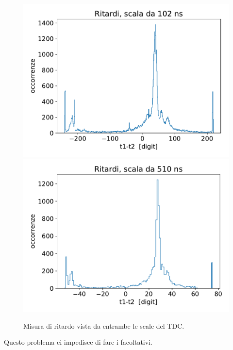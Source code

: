 \begin{figure}[h]
\centering
\subfloat
{\includegraphics[width=17 em]{immagini/100}
\label{100}} \quad
\subfloat
{\includegraphics[width=17 em]{immagini/500}
\label{500}}

\caption{Misura di ritardo vista da entrambe le scale del TDC.}
\label{confronto}
\end{figure}

Questo problema ci impedisce di fare i facoltativi.